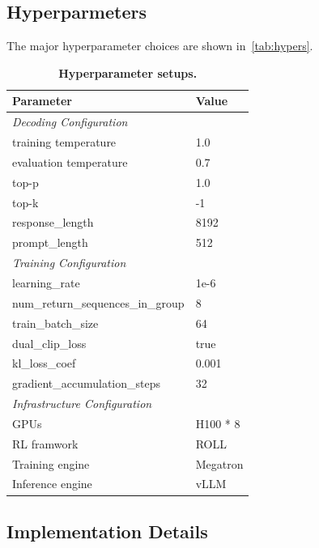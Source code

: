 \documentclass{article}
\begin{document}
\subsection{Hyperparmeters}
\label{app:hyperparams}
The major hyperparameter choices are shown in~\autoref{tab:hypers}.

\begin{table}[h]
\caption{\textbf{Hyperparameter setups.}}
\vspace{0.25cm}
\centering
\begin{tabular}{l|l}
\toprule
\textbf{Parameter} & \textbf{Value} \\
\midrule
\multicolumn{2}{l}{\textit{Decoding Configuration}} \\
\midrule
training temperature & 1.0\\
evaluation temperature & 0.7\\
top-p & 1.0\\
top-k & -1\\
response\_length & 8192 \\
prompt\_length & 512 \\
\midrule
\multicolumn{2}{l}{\textit{Training Configuration}} \\
\midrule
learning\_rate & 1e-6 \\
num\_return\_sequences\_in\_group & 8\\
train\_batch\_size & 64 \\
dual\_clip\_loss & true \\
kl\_loss\_coef & 0.001 \\
gradient\_accumulation\_steps & 32 \\
\midrule
\multicolumn{2}{l}{\textit{Infrastructure Configuration}} \\
\midrule
GPUs & H100 * 8\\
RL framwork & ROLL~\citep{roll} \\
Training engine & Megatron \\
Inference engine & vLLM \\
\bottomrule
\end{tabular}
\label{tab:hypers}

\end{table}

\subsection{Implementation Details}
\label{app:implementation-details}
\end{document}
